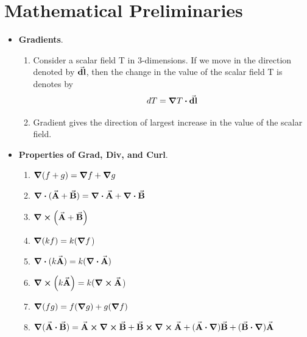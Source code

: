 \documentclass[12pt, oneside]{book}
\title{\sffamily{PH 108 Formulae}}
\author{\sffamily{Advait Risbud} \\
 \sffamily{Jujhaar Singh} \\
 \sffamily{Kartik Gokhale}}
\date{2021}
\begin{document}
	\maketitle
	\sffamily
	
\tableofcontents
	\chapter{Mathematical Preliminaries}
	\begin{itemize}
		
		\item \textbf{Gradients}. 
		\begin{enumerate}
		\item Consider a scalar field T in 3-dimensions. If we move in the direction denoted by $\va{\textbf{dl}}$, then the change in the value of the scalar field T is denotes by 
		\begin{equation}
			dT=\grad{T}\vdot \va{\textbf{dl}}
		\end{equation}
	    \item Gradient gives the direction of largest increase in the value of the scalar field.
	\end{enumerate}
      
      
       \item \textbf{Properties of Grad, Div, and Curl}.
       \begin{enumerate}
       	\item $\grad{(f+g)}=\grad{f}+\grad{g}$
       	
       	\item $\grad \vdot (\va{A}+\va{B})=\grad \vdot \va{A}+\grad \vdot \va{B}$
       	
       	\item $\curl (\va{A}+\va{B})$ 
       	

       	
       	
       	\item $\grad{(kf)}=k(\grad{f}$)
       	
       	\item $\div{(k\va{A})}=k(\div{\va{A}})$
       	
       	\item $\curl (k\va{A})=k( \curl{\va{A}}$)
       	
       	\item $\grad{(fg)}=f(\grad{g})+g(\grad{f})$
       	
       	\item $\grad{(\va{A}\vdot \va{B})}=\va{A}\cross\curl{\va{B}}+\va{B}\cross \curl{\va{A}}+(\va{A}\vdot \grad)\va{B}+(\va{B}\vdot \grad)\va{A}$
       	

\end{enumerate}
\end{itemize}
\end{document}
